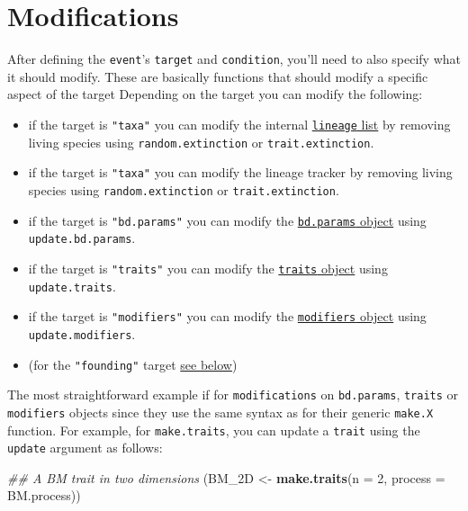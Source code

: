\documentclass[
]{book}
\newenvironment{Shaded}{\begin{snugshade}}{\end{snugshade}}
\newcommand{\CommentTok}[1]{\textcolor[rgb]{0.56,0.35,0.01}{\textit{#1}}}
\newcommand{\DataTypeTok}[1]{\textcolor[rgb]{0.13,0.29,0.53}{#1}}
\newcommand{\DecValTok}[1]{\textcolor[rgb]{0.00,0.00,0.81}{#1}}
\newcommand{\KeywordTok}[1]{\textcolor[rgb]{0.13,0.29,0.53}{\textbf{#1}}}
\newcommand{\NormalTok}[1]{#1}
\newcommand{\StringTok}[1]{\textcolor[rgb]{0.31,0.60,0.02}{#1}}
\providecommand{\tightlist}{%
  \setlength{\itemsep}{0pt}\setlength{\parskip}{0pt}}
\begin{document}
\hypertarget{modifications}{%
\section{Modifications}\label{modifications}}

After defining the \texttt{event}'s \texttt{target} and \texttt{condition}, you'll need to also specify what it should modify.
These are basically functions that should modify a specific aspect of the target
Depending on the target you can modify the following:

\begin{itemize}
\tightlist
\item
  if the target is \texttt{"taxa"} you can modify the internal \protect\hyperlink{allowarguments}{\texttt{lineage} list} by removing living species using \texttt{random.extinction} or \texttt{trait.extinction}.
\item
  if the target is \texttt{"taxa"} you can modify the lineage tracker by removing living species using \texttt{random.extinction} or \texttt{trait.extinction}.
\item
  if the target is \texttt{"bd.params"} you can modify the \protect\hyperlink{makebdparams}{\texttt{bd.params} object} using \texttt{update.bd.params}.
\item
  if the target is \texttt{"traits"} you can modify the \protect\hyperlink{maketraits}{\texttt{traits} object} using \texttt{update.traits}.
\item
  if the target is \texttt{"modifiers"} you can modify the \protect\hyperlink{makemodifiers}{\texttt{modifiers} object} using \texttt{update.modifiers}.
\item
  (for the \texttt{"founding"} target \protect\hyperlink{founding}{see below})
\end{itemize}

The most straightforward example if for \texttt{modifications} on \texttt{bd.params}, \texttt{traits} or \texttt{modifiers} objects since they use the same syntax as for their generic \texttt{make.X} function.
For example, for \texttt{make.traits}, you can update a \texttt{trait} using the \texttt{update} argument as follows:

\begin{Shaded}
\begin{Highlighting}[]
\CommentTok{\#\# A BM trait in two dimensions}
\NormalTok{(BM\_2D \textless{}{-}}\StringTok{ }\KeywordTok{make.traits}\NormalTok{(}\DataTypeTok{n =} \DecValTok{2}\NormalTok{, }\DataTypeTok{process =}\NormalTok{ BM.process))}
\end{Highlighting}
\end{Shaded}
\end{document}

